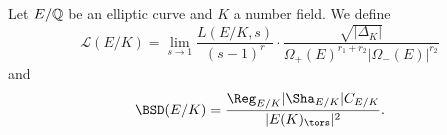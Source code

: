 \begin{notation}
    Let $E/\mathbb{Q}$ be an elliptic curve and $K$ a number field. We define 
    $$\mathcal{L}(E/K)=\lim_{s\to1}\frac{L(E/K,s)}{(s-1)^r}\cdot\frac{\sqrt{|\Delta_K|}}{\Omega_+(E)^{r_1+r_2}|\Omega_-(E)|^{r_2}}$$
    and
    $$\BSD(E/K)=\frac{\Reg_{E/K}|\Sha_{E/K}|C_{E/K}}{|E(K)_{\tors}|^2}.$$
\end{notation}


